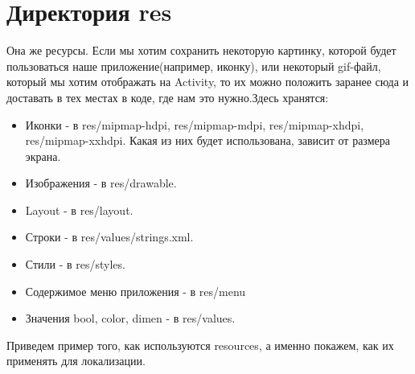 \documentclass[12 pt]{article}
\begin{document}
\section{Директория res}
Она же ресурсы. Если мы хотим сохранить некоторую картинку, которой будет пользоваться наше приложение(например, иконку), или некоторый gif-файл, который мы хотим отображать на Activity, то их можно положить заранее сюда и доставать в тех местах в коде, где нам это нужно.Здесь хранятся:
\begin{itemize}
\item Иконки - в res/mipmap-hdpi, res/mipmap-mdpi, res/mipmap-xhdpi, res/mipmap-xxhdpi. Какая из них будет использована, зависит от размера экрана.
\item Изображения - в res/drawable. 
\item Layout - в res/layout.
\item Строки - в res/values/strings.xml.
\item Стили - в res/styles.
\item Содержимое меню приложения - в res/menu
\item Значения bool, color, dimen - в res/values.
\end{itemize}
Приведем пример того, как используются resources, а именно покажем, как их применять для локализации. \newline
\end{document}
